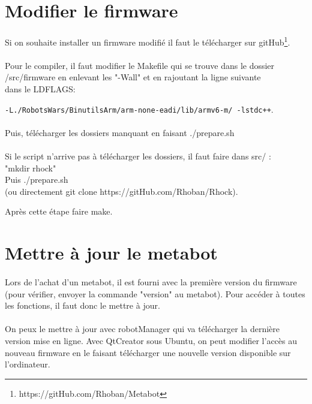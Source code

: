 \documentclass[10pt,a4paper]{report}
\begin{document}
\section{Modifier le firmware}
\paragraph{}

Si on souhaite installer un firmware modifié il faut le télécharger sur  gitHub\footnote{https://gitHub.com/Rhoban/Metabot}.
\paragraph{}
Pour le compiler, il faut modifier le Makefile qui se trouve dans le dossier\\ /src/firmware en enlevant les "-Wall" et en rajoutant la ligne suivante \\dans le LDFLAGS:

\texttt{-L./RobotsWars/BinutilsArm/arm-none-eadi/lib/armv6-m/ -lstdc++}.


\paragraph{}
Puis, télécharger les dossiers manquant en faisant ./prepare.sh
\paragraph{}
Si le script n'arrive pas à télécharger les dossiers, il faut faire dans src/ :\\
"mkdir rhock"  \\
Puis ./prepare.sh \\
(ou directement git clone https://gitHub.com/Rhoban/Rhock).

Après cette étape faire make.

\section{Mettre à jour le metabot}
\paragraph{}
Lors de l'achat d'un metabot, il est fourni avec la première version du firmware (pour vérifier, envoyer la commande "version" au metabot). Pour accéder à toutes les fonctions, il faut donc le mettre à jour.
\paragraph{}
On peux le mettre à jour avec robotManager qui va télécharger la dernière version mise en ligne.
Avec QtCreator sous Ubuntu, on peut modifier l'accès au nouveau firmware en le faisant télécharger une nouvelle version disponible sur l'ordinateur.
\end{document}
